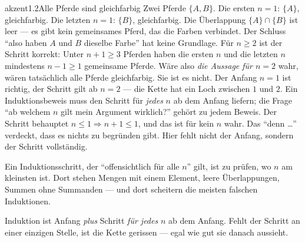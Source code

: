 \begin{loesungkarte}{akzent}{1.2}{Alle Pferde sind gleichfarbig}
Zwei Pferde $\{A, B\}$. Die ersten $n = 1$: $\{A\}$, gleichfarbig. Die letzten $n = 1$: $\{B\}$, gleichfarbig. Die Überlappung $\{A\}\cap\{B\}$ ist leer --- es gibt kein gemeinsames Pferd, das die Farben verbindet. Der Schluss \enquote{also haben $A$ und $B$ dieselbe Farbe} hat keine Grundlage.
Für $n\ge2$ ist der Schritt korrekt: Unter $n + 1\ge3$ Pferden haben die ersten $n$ und die letzten $n$ mindestens $n - 1\ge1$ gemeinsame Pferde. Wäre also \emph{die Aussage für $n = 2$} wahr, wären tatsächlich alle Pferde gleichfarbig. Sie ist es nicht.
Der Anfang $n = 1$ ist richtig, der Schritt gilt ab $n = 2$ --- die Kette hat ein Loch zwischen $1$ und $2$. Ein Induktionsbeweis muss den Schritt für \emph{jedes} $n$ ab dem Anfang liefern; die Frage \enquote{ab welchem $n$ gilt mein Argument wirklich?} gehört zu jedem Beweis.
Der Schritt behauptet $n\le1\Rightarrow n + 1\le1$, und das ist für kein $n$ wahr. Das \enquote{denn \dots} verdeckt, dass es nichts zu begründen gibt. Hier fehlt nicht der Anfang, sondern der Schritt vollständig.
\begin{fehler}\kastentext
Ein Induktionsschritt, der \enquote{offensichtlich für alle $n$} gilt, ist zu prüfen, wo $n$ am kleinsten ist. Dort stehen Mengen mit einem Element, leere Überlappungen, Summen ohne Summanden --- und dort scheitern die meisten falschen Induktionen.
\end{fehler}
\begin{mitnehmen}\kastentext
Induktion ist Anfang \emph{plus} Schritt \emph{für jedes} $n$ ab dem Anfang. Fehlt der Schritt an einer einzigen Stelle, ist die Kette gerissen --- egal wie gut sie danach aussieht.
\end{mitnehmen}
\end{loesungkarte}

